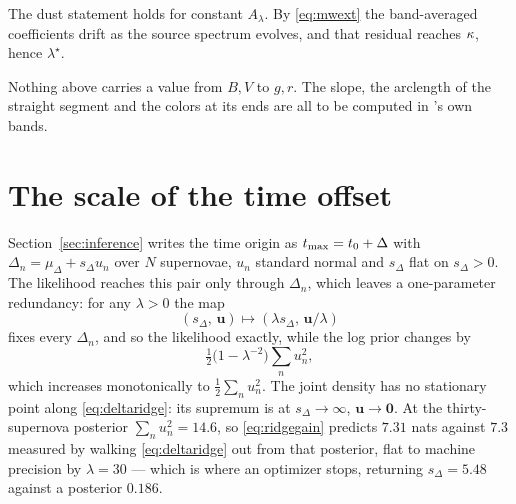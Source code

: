 \documentclass[11pt]{article}
\theoremstyle{plain}
\begin{document}
The dust statement holds for constant $A_{\lambda}$. By \eqref{eq:mwext} the band-averaged
coefficients drift as the source spectrum evolves, and that residual reaches $\kappa$,
hence $\lambda^{\star}$.

Nothing above carries a value from $B,V$ to $g,r$. The slope, the arclength of the straight
segment and the colors at its ends are all to be computed in \ztf's own bands.


\appendix

\section{The scale of the time offset}
\label{app:sdelta}

Section~\ref{sec:inference} writes the time origin as $t_{\mathrm{max}} = t_{0} + \Delta$ with
$\Delta_{n} = \mu_{\Delta} + s_{\Delta}u_{n}$ over $N$ supernovae, $u_{n}$ standard normal
and $s_{\Delta}$ flat on $s_{\Delta} > 0$. The likelihood reaches this pair only through
$\Delta_{n}$, which leaves a one-parameter redundancy: for any $\lambda > 0$ the map
\begin{equation}
  (s_{\Delta},\, \mathbf{u}) \longmapsto (\lambda s_{\Delta},\, \mathbf{u}/\lambda)
  \label{eq:deltaridge}
\end{equation}
fixes every $\Delta_{n}$, and so the likelihood exactly, while the log prior changes by
\begin{equation}
  \tfrac{1}{2}\bigl(1 - \lambda^{-2}\bigr)\sum_{n} u_{n}^{2} ,
  \label{eq:ridgegain}
\end{equation}
which increases monotonically to $\tfrac{1}{2}\sum_{n}u_{n}^{2}$. The joint density has no
stationary point along \eqref{eq:deltaridge}: its supremum is at $s_{\Delta} \to \infty$,
$\mathbf{u} \to \mathbf{0}$. At the thirty-supernova posterior $\sum_{n}u_{n}^{2} = 14.6$,
so \eqref{eq:ridgegain} predicts $7.31$ nats against $7.3$ measured by walking
\eqref{eq:deltaridge} out from that posterior, flat to machine precision by
$\lambda = 30$ --- which is where an optimizer stops, returning $s_{\Delta} = 5.48$ against
a posterior $0.186$.
\end{document}
